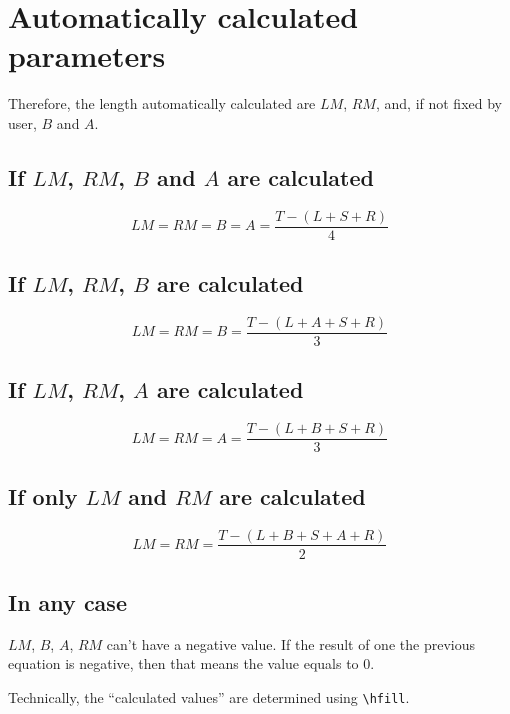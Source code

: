 \documentclass[11pt,a4paper]{article}
\begin{document}
\section{Automatically calculated parameters}
Therefore, the length automatically calculated are $LM$, $RM$, and, if not fixed by user, $B$ and $A$. 


\subsection{If $LM$, $RM$, $B$ and $A$ are calculated}
\begin{equation}
	LM = RM = B = A = \frac{T - (L + S + R)}{4}
\end{equation}

\subsection{If $LM$, $RM$, $B$ are calculated}

\begin{equation}
	LM = RM = B = \frac{T - (L + A + S + R)}{3}
\end{equation}

\subsection{If $LM$, $RM$, $A$ are calculated}

\begin{equation}
	LM = RM = A = \frac{T - (L + B + S + R)}{3}
\end{equation}
\subsection{If only $LM$ and $RM$ are calculated}

\begin{equation}
	LM = RM = \frac{T - (L + B + S + A + R)}{2}
\end{equation}

\subsection{In any case}
$LM$, $B$, $A$, $RM$ can't have a negative value. If the result of one the previous equation is negative, then that means the value equals to $0$.

Technically, the \enquote{calculated values} are determined using \verb+\hfill+.
\end{document}

